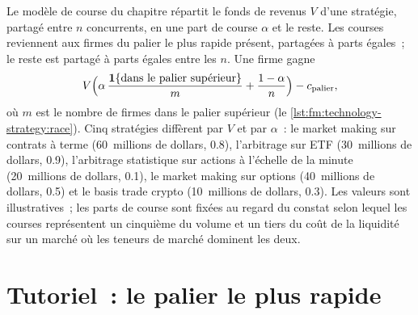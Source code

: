 Le modèle de course du chapitre répartit le fonds de revenus $V$ d'une stratégie, partagé entre $n$ concurrents, en une part de course $\alpha$ et le reste. Les courses reviennent aux
firmes du palier le plus rapide présent, partagées à parts égales~; le reste est partagé à parts égales entre les $n$. Une firme gagne
\[
V\Bigl(\alpha\,\frac{\mathbf 1\{\text{dans le palier supérieur}\}}{m}+\frac{1-\alpha}{n}\Bigr)-c_{\text{palier}},
\]
où $m$ est le nombre de firmes dans le palier supérieur (le \cref{lst:fm:technology-strategy:race}). Cinq stratégies diffèrent par $V$ et par $\alpha$~: le market making sur contrats à terme
(60~millions de dollars, 0.8), l'arbitrage sur ETF (30~millions de dollars, 0.9), l'arbitrage statistique sur actions à l'échelle de la minute (20~millions de dollars, 0.1), le market making sur options
(40~millions de dollars, 0.5) et le basis trade crypto (10~millions de dollars, 0.3). Les valeurs sont illustratives~; les parts de course sont fixées au regard du
constat selon lequel les courses représentent un cinquième du volume et un tiers du coût de la liquidité sur un marché où les teneurs de marché dominent les deux.

\label{lst:fm:technology-strategy:race}

\section{Tutoriel~: le palier le plus rapide}\label{tut:fm:technology-strategy:tut}

